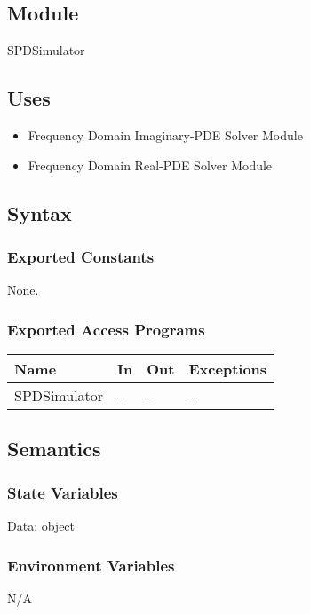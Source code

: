 \documentclass[12pt, titlepage]{article}
\begin{document}
\subsection{Module}
SPDSimulator

\subsection{Uses}
\begin{itemize}
	\item Frequency Domain Imaginary-PDE Solver Module
	\item Frequency Domain Real-PDE Solver Module
\end{itemize}

\subsection{Syntax}

\subsubsection{Exported Constants}
None.
\subsubsection{Exported Access Programs}

\begin{center}
	\begin{tabular}{p{4cm} p{4cm} p{4cm} p{2cm}}
		\hline
		\textbf{Name} & \textbf{In} & \textbf{Out} & \textbf{Exceptions} \\
		\hline
		SPDSimulator & - & - & - \\
		\hline
	\end{tabular}
\end{center}

\subsection{Semantics}

\subsubsection{State Variables}

Data: object

\subsubsection{Environment Variables}
N/A
 
\end{document}
